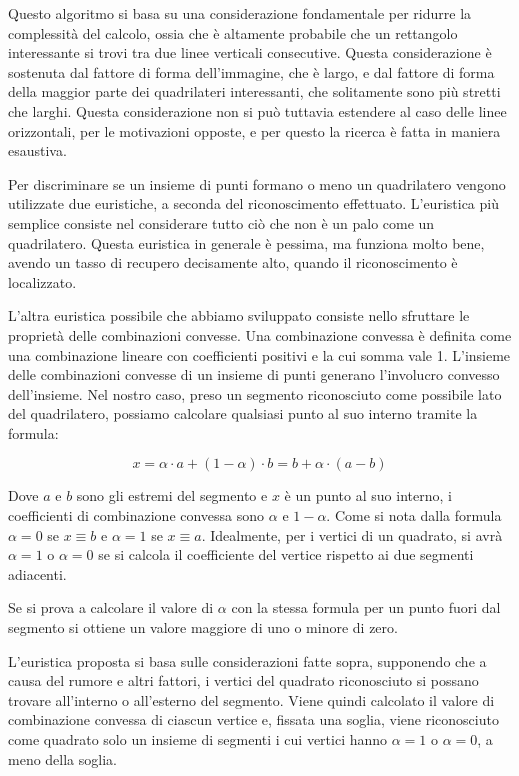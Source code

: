 Questo algoritmo si basa su una considerazione fondamentale per ridurre la complessità del calcolo, ossia che è altamente probabile che un rettangolo interessante si trovi tra due linee verticali consecutive. Questa considerazione è sostenuta dal fattore di forma dell'immagine, che è largo, e dal fattore di forma della maggior parte dei quadrilateri interessanti, che solitamente sono più stretti che larghi. Questa considerazione non si può tuttavia estendere al caso delle linee orizzontali, per le motivazioni opposte, e per questo la ricerca è fatta in maniera esaustiva.


Per discriminare se un insieme di punti formano o meno un quadrilatero vengono utilizzate due euristiche, a seconda del riconoscimento effettuato.
L'euristica più semplice consiste nel considerare tutto ciò che non è un palo come un quadrilatero. Questa euristica in generale è pessima, ma funziona molto bene, avendo un tasso di recupero decisamente alto, quando il riconoscimento è localizzato.

L'altra euristica possibile che abbiamo sviluppato consiste nello sfruttare le proprietà delle combinazioni convesse. Una combinazione convessa è definita come una combinazione lineare con coefficienti positivi e la cui somma vale 1. L'insieme delle combinazioni convesse di un insieme di punti generano l'involucro convesso dell'insieme.
Nel nostro caso, preso un segmento riconosciuto come possibile lato del quadrilatero, possiamo calcolare qualsiasi punto al suo interno tramite la formula:

\begin{equation}
  x = \alpha\cdot a + (1 - \alpha)\cdot b = b + \alpha\cdot(a - b)
\end{equation}

Dove $a$ e $b$ sono gli estremi del segmento e $x$ è un punto al suo interno, i coefficienti di combinazione convessa sono $\alpha$ e $1 - \alpha$.
Come si nota dalla formula $\alpha = 0$ se $x \equiv b$ e $\alpha = 1$ se $x \equiv a$.
Idealmente, per i vertici di un quadrato, si avrà $\alpha=1$ o $\alpha=0$ se si calcola il coefficiente del vertice rispetto ai due segmenti adiacenti.

Se si prova a calcolare il valore di $\alpha$ con la stessa formula per un punto fuori dal segmento si ottiene un valore maggiore di uno o minore di zero.

L'euristica proposta si basa sulle considerazioni fatte sopra, supponendo che a causa del rumore e altri fattori, i vertici del quadrato riconosciuto si possano trovare all'interno o all'esterno del segmento. Viene quindi calcolato il valore di combinazione convessa di ciascun vertice e, fissata una soglia, viene riconosciuto come quadrato solo un insieme di segmenti i cui vertici hanno $\alpha=1$ o $\alpha=0$, a meno della soglia.

